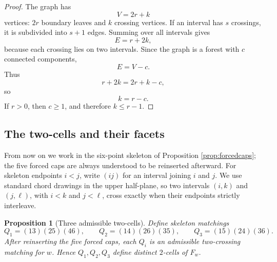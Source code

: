 \documentclass[12pt]{article}
\newtheorem{proposition}[theorem]{Proposition}
\theoremstyle{definition}
\begin{document}
\begin{proof}
The graph has
\[
V=2r+k
\]
vertices: \(2r\) boundary leaves and \(k\) crossing vertices.  If an interval has \(s\) crossings, it is subdivided into \(s+1\) edges.  Summing over all intervals gives
\[
E=r+2k,
\]
because each crossing lies on two intervals.  Since the graph is a forest with \(c\) connected components,
\[
E=V-c.
\]
Thus
\[
r+2k=2r+k-c,
\]
so
\[
k=r-c.
\]
If \(r>0\), then \(c\ge 1\), and therefore \(k\le r-1\).
\end{proof}

\subsection{The two-cells and their facets}

From now on we work in the six-point skeleton of Proposition \ref{prop:forcedcaps}; the five forced caps are always understood to be reinserted afterward.  For skeleton endpoints \(i<j\), write \((ij)\) for an interval joining \(i\) and \(j\).  We use standard chord drawings in the upper half-plane, so two intervals \((i,k)\) and \((j,\ell)\), with \(i<k\) and \(j<\ell\), cross exactly when their endpoints strictly interleave.

\begin{proposition}[Three admissible two-cells]\label{prop:twocells}
Define skeleton matchings
\[
Q_1=(13)(25)(46),\qquad
Q_2=(14)(26)(35),\qquad
Q_3=(15)(24)(36).
\]
After reinserting the five forced caps, each \(Q_i\) is an admissible two-crossing matching for \(w\).  Hence \(Q_1,Q_2,Q_3\) define distinct \(2\)-cells of \(F_w\).
\end{proposition}
\end{document}
